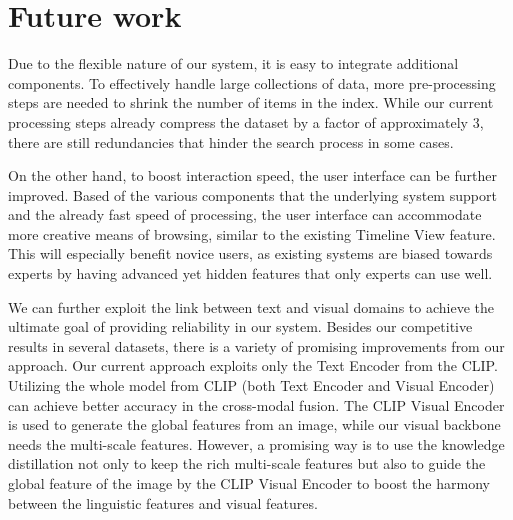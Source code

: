 \section{Future work}
\label{sec:future_work}
Due to the flexible nature of our system, it is easy to integrate additional components. To effectively handle large collections of data, more pre-processing steps are needed to shrink the number of items in the index. While our current processing steps already compress the dataset by a factor of approximately 3, there are still redundancies that hinder the search process in some cases. 

On the other hand, to boost interaction speed, the user interface can be further improved. Based of the various components that the underlying system support and the already fast speed of processing, the user interface can accommodate more creative means of browsing, similar to the existing Timeline View feature. This will especially benefit novice users, as existing systems are biased towards experts by having advanced yet hidden features that only experts can use well.

We can further exploit the link between text and visual domains to achieve the ultimate goal of providing reliability in our system. Besides our competitive results in several datasets, there is a variety of promising improvements from our approach. Our current approach exploits only the Text Encoder from the CLIP. Utilizing the whole model from CLIP (both Text Encoder and Visual Encoder) can achieve better accuracy in the cross-modal fusion. The CLIP Visual Encoder is used to generate the global features from an image, while our visual backbone needs the multi-scale features. However, a promising way is to use the knowledge distillation not only to keep the rich multi-scale features but also to guide the global feature of the image by the CLIP Visual Encoder to boost the harmony between the linguistic features and visual features.
